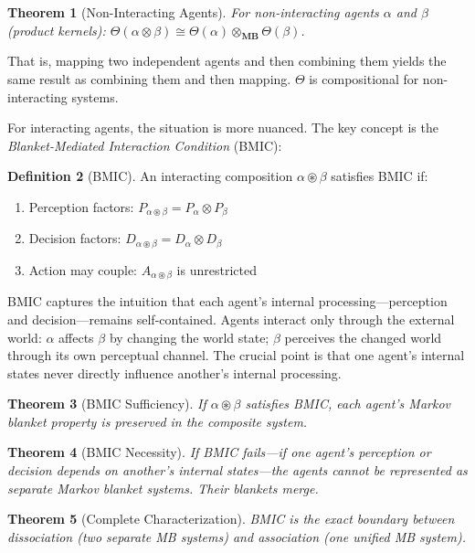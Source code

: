 \documentclass[11pt,a4paper]{article}
\theoremstyle{definition}
\newtheorem{definition}{Definition}[section]
\theoremstyle{plain}
\newtheorem{theorem}[definition]{Theorem}
\theoremstyle{remark}
\newcommand{\MB}{\mathbf{MB}}
\begin{document}
\begin{theorem}[Non-Interacting Agents]
For non-interacting agents $\alpha$ and $\beta$ (product kernels): $\Theta(\alpha \otimes \beta) \cong \Theta(\alpha) \otimes_{\MB} \Theta(\beta)$.
\end{theorem}

That is, mapping two independent agents and then combining them yields the same result as combining them and then mapping. $\Theta$ is compositional for non-interacting systems.

For interacting agents, the situation is more nuanced. The key concept is the \textit{Blanket-Mediated Interaction Condition} (BMIC):

\begin{definition}[BMIC]
An interacting composition $\alpha \circledast \beta$ satisfies BMIC if:
\begin{enumerate}
    \item[\textbf{(BMIC-1)}] Perception factors: $P_{\alpha \circledast \beta} = P_\alpha \otimes P_\beta$
    \item[\textbf{(BMIC-2)}] Decision factors: $D_{\alpha \circledast \beta} = D_\alpha \otimes D_\beta$
    \item[\textbf{(BMIC-3)}] Action may couple: $A_{\alpha \circledast \beta}$ is unrestricted
\end{enumerate}
\end{definition}

BMIC captures the intuition that each agent's internal processing---perception and decision---remains self-contained. Agents interact only through the external world: $\alpha$ affects $\beta$ by changing the world state; $\beta$ perceives the changed world through its own perceptual channel. The crucial point is that one agent's internal states never directly influence another's internal processing.

\begin{theorem}[BMIC Sufficiency]
If $\alpha \circledast \beta$ satisfies BMIC, each agent's Markov blanket property is preserved in the composite system.
\end{theorem}

\begin{theorem}[BMIC Necessity]
If BMIC fails---if one agent's perception or decision depends on another's internal states---the agents cannot be represented as separate Markov blanket systems. Their blankets merge.
\end{theorem}

\begin{theorem}[Complete Characterization]
BMIC is the exact boundary between dissociation (two separate MB systems) and association (one unified MB system).
\end{theorem}
\end{document}
